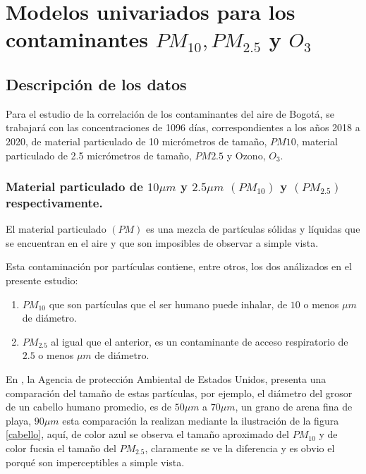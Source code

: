 \chapter{Modelos univariados para los contaminantes $PM_{10}, PM_{2.5}$ y $O_3$} 


\section{Descripción de los datos}

Para el estudio de la correlación de los contaminantes del aire de Bogotá, se trabajará con las concentraciones de 1096 días, correspondientes a los años 2018 a 2020, de material particulado de 10 micrómetros de tamaño, $PM 10$, material particulado de 2.5 micrómetros de tamaño, $PM 2.5$ y Ozono, $O_3$. 

\subsection{Material particulado de $10\mu m$ y $2.5\mu m$ $(PM_{10})$ y $(PM_{2.5})$ respectivamente.}

El material particulado $(PM)$ es una mezcla de partículas sólidas y líquidas que se encuentran en el aire y que son imposibles de observar a simple vista. 

Esta contaminación por partículas contiene, entre otros, los dos análizados en el presente estudio: 

\begin{enumerate}

\item
\textbf{$PM_{10}$} que son partículas que el ser humano puede inhalar, de $10$ o menos $\mu m$ de diámetro. 

\item
\textbf{$PM_{2.5}$} al igual que el anterior, es un contaminante de acceso respiratorio de $2.5$ o menos $\mu m$ de diámetro.
\end{enumerate}

En \cite{EPA}, la Agencia de protección Ambiental de Estados Unidos, presenta una comparación del tamaño de estas partículas, por ejemplo, el diámetro del grosor de un cabello humano promedio, es de $50\mu m$ a $70\mu m$, un grano de arena fina de playa, $90\mu m$ esta comparación la realizan mediante la ilustración de la figura \ref{cabello}, aquí, de color azul se observa el tamaño aproximado del $PM_{10}$ y de color fucsia el tamaño del $PM_{2.5}$, claramente se ve la diferencia y es obvio el porqué son imperceptibles a simple vista.  

